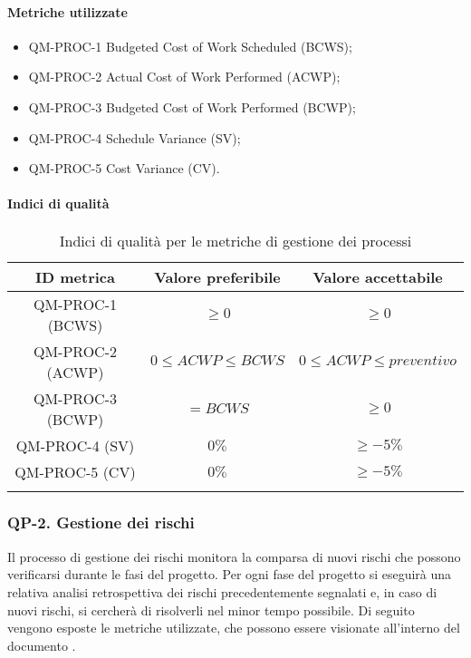 		\paragraph{Metriche utilizzate}

			\begin{itemize}
				\item QM-PROC-1 Budgeted Cost of Work Scheduled (BCWS);
				\item QM-PROC-2 Actual Cost of Work Performed (ACWP);
				\item QM-PROC-3 Budgeted Cost of Work Performed (BCWP);
				\item QM-PROC-4 Schedule Variance (SV);
				\item QM-PROC-5 Cost Variance (CV).
			\end{itemize}
		\pagebreak
		\paragraph{Indici di qualità}

			\begin{center}
				\begin{longtable}{|c|c|c|}
				\hline
				\rowcolor{lighter-grayer}
				\textbf{ID metrica} & \textbf{Valore preferibile} & \textbf{Valore accettabile}\\
				\hline
				\endfirsthead
				\hline
				QM-PROC-1 (BCWS) & \(\ge 0\) & \(\ge 0\) \\
				\hline
				QM-PROC-2 (ACWP) & \(0 \le ACWP \le BCWS\) & \(0 \le ACWP \le preventivo\) \\
				\hline
				QM-PROC-3 (BCWP) & \(= BCWS\) & \(\ge 0\) \\
				\hline
				QM-PROC-4 (SV) & \(0\%\) & \(\ge -5\%\) \\
				\hline
				QM-PROC-5 (CV) & \(0\%\) & \(\ge -5\%\) \\
				\hline
				\caption{Indici di qualità per le metriche di gestione dei processi}
				\end{longtable}
			\end{center}

	\subsubsection{QP-2. Gestione dei rischi}

		Il processo di gestione dei rischi monitora la comparsa di nuovi rischi che possono verificarsi durante le fasi del progetto.
		\newline
		Per ogni fase del progetto si eseguirà una relativa analisi retrospettiva dei rischi precedentemente segnalati e, in caso di nuovi rischi, si cercherà di risolverli nel minor tempo possibile.
		\newline
		Di seguito vengono esposte le metriche utilizzate, che possono essere visionate all'interno del documento .

